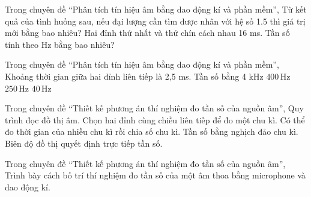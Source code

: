 \begin{ex}
Trong chuyên đề “Phân tích tín hiệu âm bằng dao động kí và phần mềm”, Từ kết quả của tình huống sau, nếu đại lượng cần tìm được nhân với hệ số 1.5 thì giá trị mới bằng bao nhiêu? Hai đỉnh thứ nhất và thứ chín cách nhau 16 ms. Tần số tính theo Hz bằng bao nhiêu?
\end{ex}

\begin{ex}
Trong chuyên đề “Phân tích tín hiệu âm bằng dao động kí và phần mềm”, Khoảng thời gian giữa hai đỉnh liên tiếp là 2,5 ms. Tần số bằng
\choice
{4 kHz}
{\True $400\,\text{Hz}$}
{$250\,\text{Hz}$}
{$40\,\text{Hz}$}
\end{ex}

\begin{ex}
Trong chuyên đề “Thiết kế phương án thí nghiệm đo tần số của nguồn âm”, Quy trình đọc đồ thị âm.
\choiceTF
{\True Chọn hai đỉnh cùng chiều liên tiếp để đo một chu kì.}
{\True Có thể đo thời gian của nhiều chu kì rồi chia số chu kì.}
{\True Tần số bằng nghịch đảo chu kì.}
{Biên độ đồ thị quyết định trực tiếp tần số.}
\end{ex}

\begin{ex}
Trong chuyên đề “Thiết kế phương án thí nghiệm đo tần số của nguồn âm”, Trình bày cách bố trí thí nghiệm đo tần số của một âm thoa bằng microphone và dao động kí.
\choiceTF

\end{ex}

